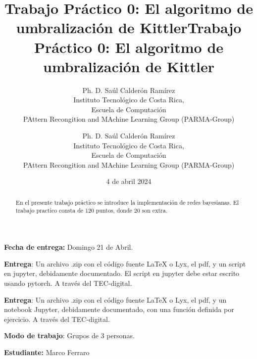 \documentclass[spanish]{article}
\title{Trabajo Práctico 0: El algoritmo de umbralización de Kittler}
\author{Ph. D. Saúl Calderón Ramírez \\
Instituto Tecnológico de Costa Rica, \\
Escuela de Computación\\
PAttern Recongition and MAchine Learning Group (PARMA-Group)}
\date{4 de abril 2024}
\begin{document}
\title{Trabajo Práctico 0: El algoritmo de umbralización de Kittler}
\author{Ph. D. Saúl Calderón Ramírez \\
Instituto Tecnológico de Costa Rica, \\
Escuela de Computación\\
PAttern Recongition and MAchine Learning Group (PARMA-Group)}

\maketitle
\textbf{Fecha de entrega: }Domingo 21 de Abril.

\textbf{Entrega}: Un archivo .zip con el código fuente LaTeX o Lyx,
el pdf, y un script en jupyter, debidamente documentado. El script
en jupyter debe estar escrito usando pytorch. A través del TEC-digital.


\textbf{Entrega}: Un archivo .zip con el código fuente LaTeX o Lyx,
el pdf, y un notebook Jupyter, debidamente documentado, con una función
definida por ejercicio. A través del TEC-digital.

\textbf{Modo de trabajo}: Grupos de 3 personas.
\begin{abstract}
En el presente trabajo práctico se introduce la implementación de
redes bayesianas. El trabajo practico consta de 120 puntos, donde
20 son extra.
\end{abstract}

\textbf{Estudiante:} Marco Ferraro
\end{document}
